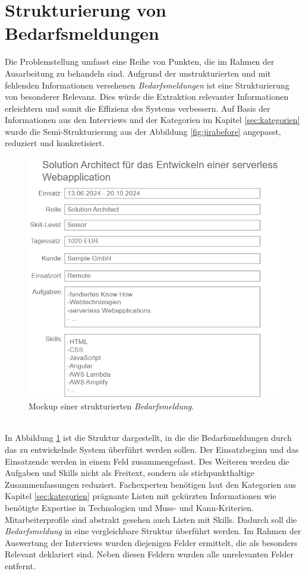 \section{Strukturierung von Bedarfsmeldungen}
\label{sec:strukturierungbedarfsmeldung}
Die Problemstellung umfasst eine Reihe von Punkten, die im Rahmen der Ausarbeitung zu behandeln sind. Aufgrund der unstrukturierten und mit fehlenden Informationen versehenen \emph{Bedarfsmeldungen} ist eine Strukturierung von besonderer Relevanz. Dies würde die Extraktion relevanter Informationen erleichtern und somit die Effizienz des Systems verbessern. Auf Basis der Informationen aus den Interviews und der Kategorien im Kapitel \ref{sec:kategorien} wurde die Semi-Strukturierung aus der Abbildung \ref{fig:jirabefore} angepasst, reduziert und konkretisiert.
\begin{figure}[H]%
	\centering  
	\includegraphics[scale=1]{Abbildungen/jiraAfter.png}
	\caption{Mockup einer strukturierten \emph{Bedarfsmeldung}.}
	\label{fig:jiraafter}
\end{figure}\mbox{} \\
In Abbildung \ref{fig:jiraafter} ist die Struktur dargestellt, in die die Bedarfsmeldungen durch das zu entwickelnde System überführt werden sollen. Der Einsatzbeginn und das Einsatzende werden in einem Feld zusammengefasst. Des Weiteren werden die Aufgaben und Skills nicht als Freitext, sondern als stichpunkthaltige Zusammenfassungen reduziert. Fachexperten benötigen laut den Kategorien aus Kapitel \ref{sec:kategorien} prägnante Listen mit gekürzten Informationen wie benötigte Expertise in Technologien und Muss- und Kann-Kriterien. Mitarbeiterprofile sind abstrakt gesehen auch Listen mit Skills. Dadurch soll die \emph{Bedarfsmeldung} in eine vergleichbare Struktur überführt werden. Im Rahmen der Auswertung der Interviews wurden diejenigen Felder ermittelt, die als besonders Relevant deklariert sind. Neben diesen Feldern wurden alle unrelevanten Felder entfernt.\\

